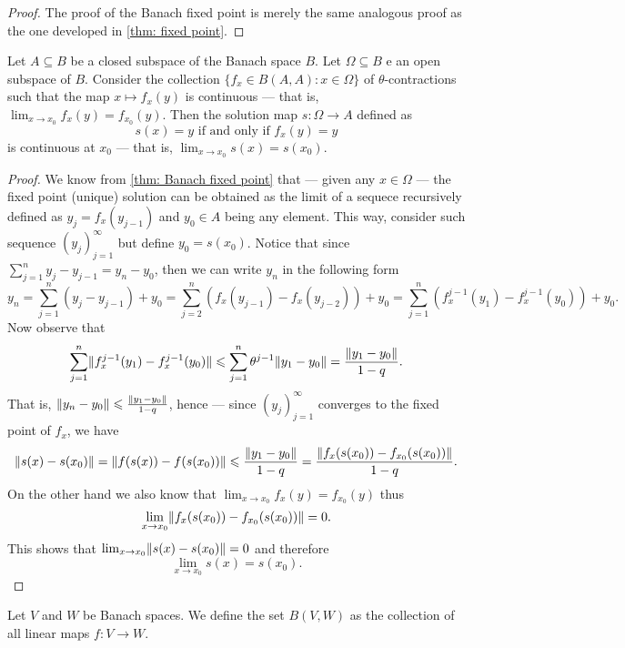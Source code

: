 \begin{proof}
The proof of the Banach fixed point is merely the same analogous proof as the
one developed in \cref{thm: fixed point}.
\end{proof}

\begin{proposition}
\label{prop:fixed-point-stability}
Let \(A \subseteq B\) be a closed subspace of the Banach space \(B\). Let \(\Omega \subseteq B\) e
an open subspace of \(B\). Consider the collection \(\{f_{x} \in B(A, A) \colon x \in
\Omega\}\)   of \(\theta\)-contractions such that the map \(x \mapsto f_x(y)\) is continuous ---
that is, \(\lim_{x\to x_0} f_x(y) = f_{x_0}(y)\).
Then the solution map \(s: \Omega \to A\) defined as
\[
s(x) = y \text{ if and only if } f_x(y) = y
\]
is continuous at \(x_0\) --- that is, \(\lim_{x \to x_0} s(x) = s(x_0)\).
\end{proposition}

\begin{proof}
We know from \cref{thm: Banach fixed point} that --- given any \(x \in \Omega\) ---
the fixed point (unique) solution can be obtained as the limit of
a sequece recursively defined as \(y_j = f_x(y_{j-1})\) and \(y_0 \in A\) being
any element. This way, consider such sequence \((y_j)_{j=1}^{\infty}\) but define
\(y_0 = s(x_0)\). Notice that since \(\sum_{j=1}^n y_j - y_{j-1} = y_n - y_0\),
then we can write \(y_n\) in the following form
\[
y_n = \sum_{j=1}^n (y_j - y_{j-1}) + y_0
= \sum_{j=2}^n (f_x(y_{j-1}) - f_x(y_{j-2}))
+ y_0 = \sum_{j=1}^n \left(f_x^{j-1}(y_1) - f_x^{j-1}(y_0)\right) + y_{0}.
\]
Now observe that
\[
\sum_{j=1}^n \lVert f_x^{j-1}(y_1) - f_x^{j-1}(y_0)\rVert
\leqslant \sum_{j=1}^n \theta^{j-1} \lVert y_1 -
y_0\rVert = \frac{\lVert y_1 - y_0\rVert}{1 - q}.
\]
That is, \(\lVert y_n - y_0\rVert \leqslant \frac{\lVert y_1 - y_0\rVert}{1 - q}\), hence --- since
\((y_j)_{j=1}^{\infty}\) converges to the fixed point of \(f_x\), we have
\begin{align*}
\lVert s(x) - s(x_0)\rVert = \lVert f(s(x)) - f(s(x_0))\rVert
\leqslant \frac{\lVert y_1 - y_0\rVert}{1-q}
= \frac{\lVert f_x(s(x_0)) - f_{x_0}(s(x_0))\rVert}{1 - q}.
\end{align*}
On the other hand we also know that \(\lim_{x \to x_0}f_x(y) = f_{x_0}(y)\) thus
\[
\lim_{x \to x_0} \lVert f_x(s(x_0)) - f_{x_0}(s(x_0))\rVert = 0.
\]
This shows that \(\lim_{x \to x_0} \lVert s(x) - s(x_0)\rVert = 0\) and therefore
\[
\lim_{x \to x_0} s(x) = s(x_0).
\]
\end{proof}

\begin{definition}
\label{def:banach-space-hom-set}
Let \(V\) and \(W\) be Banach spaces. We define the set \(B(V, W)\) as the
collection of all linear maps \(f: V \to W\).
\end{definition}

